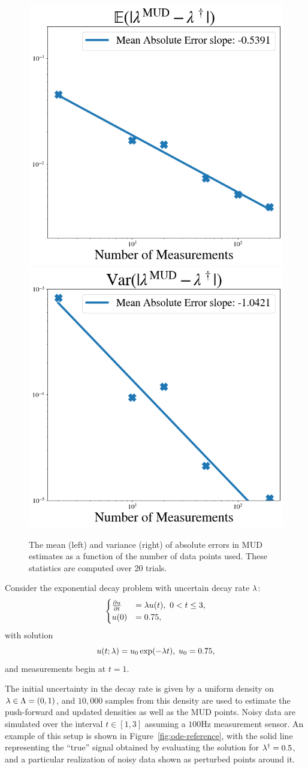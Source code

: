 \begin{figure}[htb]
  \centering
  \includegraphics[width=0.45\linewidth]{figures/ode/ode_convergence_mud_obs_mean.png}
  \includegraphics[width=0.45\linewidth]{figures/ode/ode_convergence_mud_obs_var.png}
  \caption{The mean (left) and variance (right) of absolute errors in MUD estimates as a function of the number of data points used. These statistics are computed over 20 trials.
  }
  \label{fig:ode-convergence-obs}
\end{figure}

Consider the exponential decay problem with uncertain decay rate $\lambda$:
$$
\begin{cases}
\frac{\partial u}{\partial t} & = \lambda u(t), \ 0<t\leq 3, \\ u(0) &= 0.75,
\end{cases}
$$
with solution
\begin{equation}
  u(t;\lambda) = u_0\exp(-\lambda t), \; u_0 = 0.75 ,
\end{equation}
and measurements begin at $t=1$.

The initial uncertainty in the decay rate is given by a uniform density on $\lambda \in \Lambda = (0, 1)$, and $10,000$ samples from this density are used to estimate the push-forward and updated densities as well as the MUD points.
Noisy data are simulated over the interval $t \in [1,3]$ assuming a $100$Hz measurement sensor.
An example of this setup is shown in Figure~\ref{fig:ode-reference}, with the solid line representing the ``true'' signal obtained by evaluating the solution for $\lambda^\dagger = 0.5$, and a particular realization of noisy data shown as perturbed points around it.

